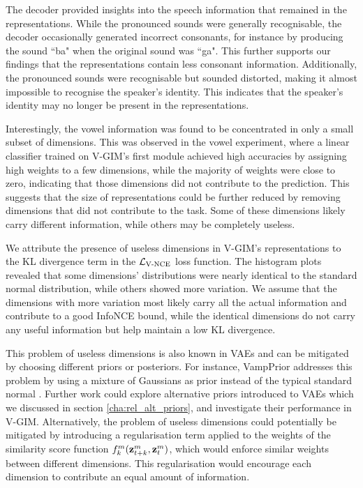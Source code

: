 	The decoder provided insights into the speech information that remained in the representations. While the pronounced sounds were generally recognisable, the decoder occasionally generated incorrect consonants, for instance by producing the sound ``ba" when the original sound was ``ga". This further supports our findings that the representations contain less consonant information. Additionally, the pronounced sounds were recognisable but sounded distorted, making it almost impossible to recognise the speaker's identity. This indicates that the speaker's identity may no longer be present in the representations.
	
	Interestingly, the vowel information was found to be concentrated in only a small subset of dimensions. This was observed in the vowel experiment, where a linear classifier trained on V-GIM's first module achieved high accuracies by assigning high weights to a few dimensions, while the majority of weights were close to zero, indicating that those dimensions did not contribute to the prediction. This suggests that the size of representations could be further reduced by removing dimensions that did not contribute to the task. Some of these dimensions likely carry different information, while others may be completely useless.
	
	
	We attribute the presence of useless dimensions in V-GIM's representations to the KL divergence term in the $\mathcal{L}_{\text{V-NCE}}$ loss function. The histogram plots revealed that some dimensions' distributions were nearly identical to the standard normal distribution, while others showed more variation. We assume that the dimensions with more variation most likely carry all the actual information and contribute to a good InfoNCE bound, while the identical dimensions do not carry any useful information but help maintain a low KL divergence.
	
			
	This problem of useless dimensions is also known in VAEs and can be mitigated by choosing different priors or posteriors. For instance, VampPrior addresses this problem by using a mixture of Gaussians as prior instead of the typical standard normal \citep{tomczakVAEVampPrior2018}. Further work could explore alternative priors introduced to VAEs which we discussed in section \ref{cha:rel_alt_priors}, and investigate their performance in V-GIM. Alternatively, the problem of useless dimensions could potentially be mitigated by introducing a regularisation term applied to the weights of the similarity score function $f_k^m({\mathbf{z}_{t+k}^m},{\mathbf{z}_t^m})$, which would enforce similar weights between different dimensions. This regularisation would encourage each dimension to contribute an equal amount of information.
	
